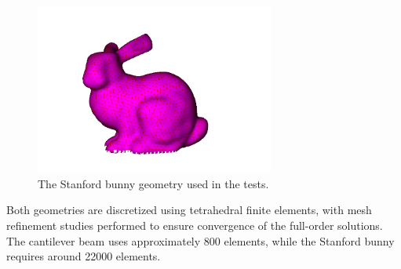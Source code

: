 \begin{figure}[H]
    \centering
    \includegraphics[width=0.7\textwidth]{Images/stanford_bunny.png}
    \caption{The Stanford bunny geometry used in the tests.}
    \label{fig:stanford_bunny}
    \end{figure}

Both geometries are discretized using tetrahedral finite elements, with mesh refinement studies performed to ensure convergence of the full-order solutions. The cantilever beam uses approximately 800 elements, while the Stanford bunny requires around 22000 elements.
